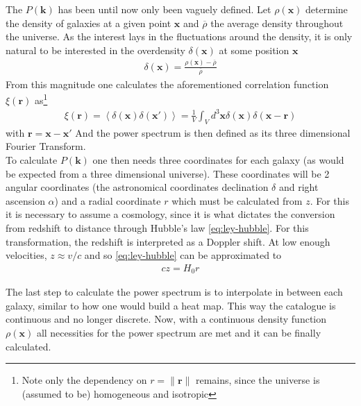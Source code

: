 The $P(\textbf{k})$ has been until now only been vaguely defined. Let  $\rho(\textbf{x})$ determine the density of galaxies at a given point $\textbf{x}$ and $ \overline{\rho}$ the average density throughout the universe. As the interest lays in the fluctuations around the density, it is only natural to be interested in the overdensity $\delta(\textbf{x})$ at some position $\textbf{x}$
\begin{align}
	\delta(\textbf{x}) = \frac{\rho\left( \textbf{x} \right) - \overline{\rho}}{\overline{\rho}}
	\label{eq:overdensity}
\end{align}
From this magnitude one calculates the aforementioned correlation function $\xi(\textbf{r})$ as\footnote{Note only the dependency on $r = \|\textbf{r}\|$ remains, since the universe is (assumed to be) homogeneous and isotropic}
\begin{align}
	\xi(\textbf{r}) = \left<\delta(\textbf{x}) \delta(\textbf{x}') \right> = \frac{1}{V}\int_{V}^{}  d^3 \textbf{x} \delta(\textbf{x}) \delta\left(\textbf{x} - \textbf{r}  \right) 
	\label{eq:correlation-function}
\end{align} with $\textbf{r} = \textbf{x} - \textbf{x}'$
And the power spectrum is then defined as its three dimensional Fourier Transform. \\

To calculate $P(\textbf{k})$ one then needs three coordinates for each galaxy (as would be expected from a three dimensional universe). These coordinates will be 2 angular coordinates (the astronomical coordinates declination $\delta$ and right ascension $\alpha$) and a radial coordinate $r$ which must be calculated from $z$. For this it is necessary to assume a cosmology, since it is what dictates the conversion from redshift to distance through Hubble's law \eqref{eq:ley-hubble}. For this transformation, the redshift is interpreted as a Doppler shift. At low enough velocities, $z\approx v /c$ and so \eqref{eq:ley-hubble} can be approximated to 
\begin{align}
c z = H_0 r	
\end{align}

The last step to calculate the power spectrum is to interpolate in between each galaxy, similar to how one would build a heat map. This way the catalogue is continuous and no longer discrete. Now, with a continuous density function $\rho(\textbf{x})$ all necessities for the power spectrum are met and it can be finally calculated. \\

